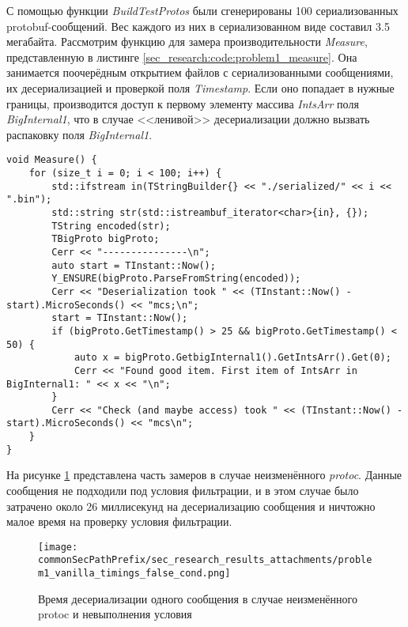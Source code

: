 С помощью функции \textit{BuildTestProtos} были сгенерированы 100 сериализованных protobuf-сообщений. Вес каждого из них в сериализованном виде составил 3.5 мегабайта.
Рассмотрим функцию для замера производительности \textit{Measure}, представленную в листинге \ref{sec_research:code:problem1_measure}.
Она занимается поочерёдным открытием файлов с сериализованными сообщениями,
их десериализацией и проверкой поля \textit{Timestamp}. Если оно попадает в нужные границы, производится доступ к первому элементу массива \textit{IntsArr} поля \textit{BigInternal1}, что в случае <<ленивой>> десериализации должно вызвать распаковку поля \textit{BigInternal1}.

\noindent\begin{minipage}{\linewidth}
\begin{lstlisting}[style=CodeListing, caption={Функция Measure}, label=sec_research:code:problem1_measure]
void Measure() {
    for (size_t i = 0; i < 100; i++) {
        std::ifstream in(TStringBuilder{} << "./serialized/" << i << ".bin");
        std::string str(std::istreambuf_iterator<char>{in}, {});
        TString encoded(str);
        TBigProto bigProto;
        Cerr << "---------------\n";
        auto start = TInstant::Now();
        Y_ENSURE(bigProto.ParseFromString(encoded));
        Cerr << "Deserialization took " << (TInstant::Now() - start).MicroSeconds() << "mcs;\n";
        start = TInstant::Now();
        if (bigProto.GetTimestamp() > 25 && bigProto.GetTimestamp() < 50) {
            auto x = bigProto.GetbigInternal1().GetIntsArr().Get(0);
            Cerr << "Found good item. First item of IntsArr in BigInternal1: " << x << "\n";
        }
        Cerr << "Check (and maybe access) took " << (TInstant::Now() - start).MicroSeconds() << "mcs\n";
    }
}
\end{lstlisting}
\end{minipage}

На рисунке \ref{fig:problem1_vanilla_timings_false_cond} представлена часть замеров в случае неизменённого \textit{protoc}. 
Данные сообщения не подходили под условия фильтрации, и в этом случае было затрачено около 26 миллисекунд на десериализацию сообщения и ничтожно малое время на проверку условия фильтрации.

\begin{figure}[ht]
    \centering
    \texttt{[image: \\commonSecPathPrefix/sec\_research\_results\_attachments/problem1\_vanilla\_timings\_false\_cond.png]}
    \caption{Время десериализации одного сообщения в случае неизменённого protoc и невыполнения условия}
    \label{fig:problem1_vanilla_timings_false_cond}
\end{figure}

